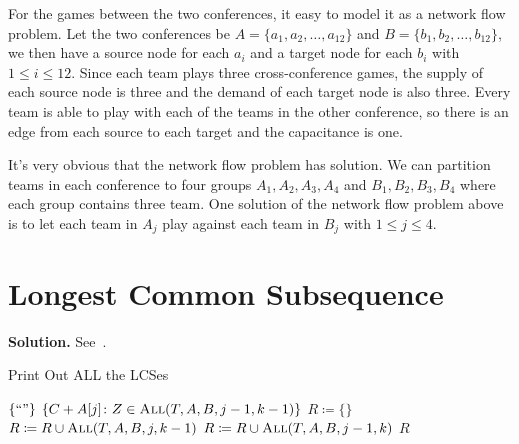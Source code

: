 \documentclass{../../cls/sig-alternate-05-2015}
\begin{document}
For the games between the two conferences, it easy to model it as a network flow problem.
Let the two conferences be $A = \{a_1, a_2, \ldots, a_{12}\}$
and $B = \{b_1, b_2, \ldots, b_{12}\}$,
we then have a source node for each $a_i$ and a target node for each $b_i$
with $1 \le i \le 12$.
Since each team plays three cross-conference games,
the supply of each source node is three and the demand of each target node is also three.
Every team is able to play with each of the teams in the other conference,
so there is an edge from each source to each target and the capacitance is one.

It's very obvious that the network flow problem has solution.
We can partition teams in each conference to four groups $A_1, A_2, A_3, A_4$
and $B_1, B_2, B_3, B_4$ where each group contains three team.
One solution of the network flow problem above is to let each team in $A_j$ play
against each team in $B_j$ with $1 \le j \le 4$.


\iffalse
It is impossible.
For each conference, the 13 teams produce in $13 \times 11 = 143$ appearances in the matches.
It is impossible because the total number of appearance should be even.
\fi

\section{Longest Common Subsequence}
\textbf{Solution.} See~.
\begin{algorithm}[H]
    \caption{Print Out ALL the LCSes}
    \label{a:3}
    \begin{algorithmic}
         \Return $\{``"\}$
        \State \Return $\{C + A[j] \colon Z \in \Call{All}{T, A, B, j - 1, k - 1}\}$
        \Else
        \State $R \coloneqq \{\}$
        \State $R \coloneqq R \cup \Call{All}{T, A, B, j, k - 1}$
        \EndIf
        \State $R \coloneqq R \cup \Call{All}{T, A, B, j - 1, k}$
        \EndIf
        \State \Return $R$
        \EndIf
        \EndProcedure
    \end{algorithmic}
\end{algorithm}
\end{document}
